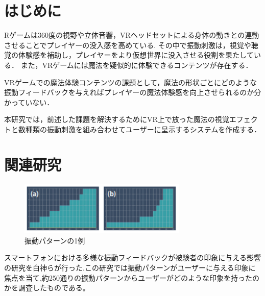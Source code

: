 \documentclass[uplatex]{jsarticle}   %
\begin{document}

\vspace{3mm}

\setcounter{page}{19}


\section{はじめに}
Rゲームは360度の視野や立体音響，VRヘッドセットによる身体の動きとの連動させることでプレイヤーの没入感を高めている.
その中で振動刺激は，視覚や聴覚の体験感を補助し，プレイヤーをより仮想世界に没入させる役割を果たしている．
また，VRゲームには魔法を疑似的に体験できるコンテンツが存在する．\cite{maho}

VRゲームでの魔法体験コンテンツの課題として，魔法の形状ごとにどのような振動フィードバックを与えればプレイヤーの魔法体験感を向上させられるのか分かっていない．

本研究では，前述した課題を解決するためにVR上で放った魔法の視覚エフェクトと数種類の振動刺激を組み合わせてユーザーに呈示するシステムを作成する．




\section{関連研究}

\begin{figure}[b]
\centering
\includegraphics[clip,width=8cm]{fig/vive_patern.png}
\caption{振動パターンの1例}\label{vive}
\end{figure}


スマートフォンにおける多様な振動フィードバックが被験者の印象に与える影響\cite{MetaCookie}の研究を白神らが行った.この研究では振動パターンがユーザーに与える印象に焦点を当て,約250通りの振動パターンからユーザーがどのような印象を持ったのかを調査したものである。
\end{document}
